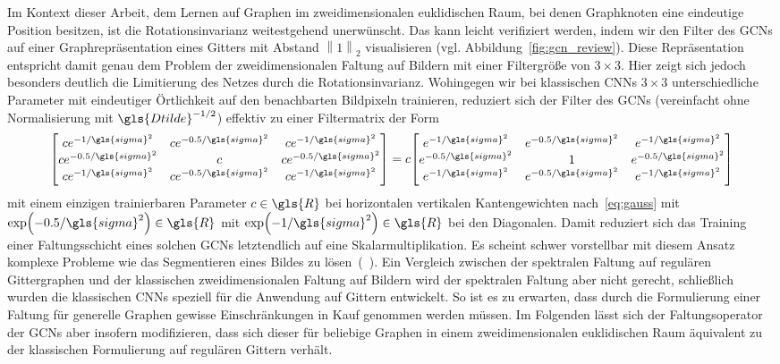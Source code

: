 Im Kontext dieser Arbeit, dem Lernen auf Graphen im zweidimensionalen euklidischen Raum, bei denen Graphknoten eine eindeutige Position besitzen, ist die Rotationsinvarianz weitestgehend unerwünscht.
Das kann leicht verifiziert werden, indem wir den Filter des \glspl{GCN} auf einer Graphrepräsentation eines Gitters mit Abstand $\left\|1\right\|_2$ visualisieren (vgl. Abbildung~\ref{fig:gcn_review}).
Diese Repräsentation entspricht damit genau dem Problem der zweidimensionalen Faltung auf Bildern mit einer Filtergröße von $3 \times 3$.
Hier zeigt sich jedoch besonders deutlich die Limitierung des Netzes durch die Rotationsinvarianz.
Wohingegen wir bei klassischen \glspl{CNN} $3 \times 3$ unterschiedliche Parameter mit eindeutiger Örtlichkeit auf den benachbarten Bildpixeln trainieren, reduziert sich der Filter des \glspl{GCN} (vereinfacht ohne Normalisierung mit $\gls{Dtilde}^{-1/2}$) effektiv zu einer Filtermatrix der Form
\begin{equation*}
  \begin{bmatrix}
    ce^{-1/\gls{sigma}^2} & ce^{-0.5/\gls{sigma}^2} & ce^{-1/\gls{sigma}^2}\\
    ce^{-0.5/\gls{sigma}^2} & c & ce^{-0.5/\gls{sigma}^2}\\
    ce^{-1/\gls{sigma}^2} & ce^{-0.5/\gls{sigma}^2} & ce^{-1/\gls{sigma}^2}
  \end{bmatrix} = c \begin{bmatrix}
    e^{-1/\gls{sigma}^2} & e^{-0.5/\gls{sigma}^2} & e^{-1/\gls{sigma}^2}\\
    e^{-0.5/\gls{sigma}^2} & 1 & e^{-0.5/\gls{sigma}^2}\\
    e^{-1/\gls{sigma}^2} & e^{-0.5/\gls{sigma}^2} & e^{-1/\gls{sigma}^2}
  \end{bmatrix}
\end{equation*}
mit einem einzigen trainierbaren Parameter $c \in \gls{R}$ bei horizontalen \bzw{} vertikalen Kantengewichten nach~\eqref{eq:gauss} mit $\exp\left(-0.5/\gls{sigma}^2\right) \in \gls{R}$ \bzw{} mit $\exp\left(-1/\gls{sigma}^2\right) \in \gls{R}$ bei den Diagonalen.
Damit reduziert sich das Training einer Faltungsschicht eines solchen \glspl{GCN} letztendlich auf eine Skalarmultiplikation.
Es scheint schwer vorstellbar mit diesem Ansatz komplexe Probleme wie \zB{} das Segmentieren eines Bildes zu lösen~(\vgl{}~\cite{gcn_review}).
Ein Vergleich zwischen der spektralen Faltung auf regulären Gittergraphen und der klassischen zweidimensionalen Faltung auf Bildern wird der spektralen Faltung aber nicht gerecht, schließlich wurden die klassischen \glspl{CNN} speziell für die Anwendung auf Gittern entwickelt.
So ist es zu erwarten, dass durch die Formulierung einer Faltung für generelle Graphen gewisse Einschränkungen in Kauf genommen werden müssen.
Im Folgenden lässt sich der Faltungsoperator der \glspl{GCN} aber insofern modifizieren, dass sich dieser für beliebige Graphen in einem zweidimensionalen euklidischen Raum äquivalent zu der klassischen Formulierung auf regulären Gittern verhält.

